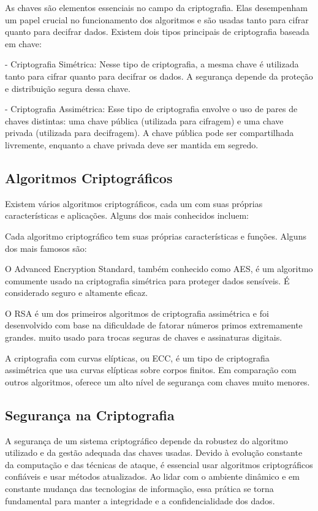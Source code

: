 As chaves são elementos essenciais no campo da criptografia. Elas desempenham um papel crucial no funcionamento dos algoritmos e são usadas tanto para cifrar quanto para decifrar dados. Existem dois tipos principais de criptografia baseada em chave:

- Criptografia Simétrica: Nesse tipo de criptografia, a mesma chave é utilizada tanto para cifrar quanto para decifrar os dados. A segurança depende da proteção e distribuição segura dessa chave.

- Criptografia Assimétrica: Esse tipo de criptografia envolve o uso de pares de chaves distintas: uma chave pública (utilizada para cifragem) e uma chave privada (utilizada para decifragem). A chave pública pode ser compartilhada livremente, enquanto a chave privada deve ser mantida em segredo.


\subsection{Algoritmos Criptográficos}

Existem vários algoritmos criptográficos, cada um com suas próprias características e aplicações. Alguns dos mais conhecidos incluem:

Cada algoritmo criptográfico tem suas próprias características e funções. Alguns dos mais famosos são:

O Advanced Encryption Standard, também conhecido como AES, é um algoritmo comumente usado na criptografia simétrica para proteger dados sensíveis. É considerado seguro e altamente eficaz.

O RSA é um dos primeiros algoritmos de criptografia assimétrica e foi desenvolvido com base na dificuldade de fatorar números primos extremamente grandes. muito usado para trocas seguras de chaves e assinaturas digitais.

A criptografia com curvas elípticas, ou ECC, é um tipo de criptografia assimétrica que usa curvas elípticas sobre corpos finitos. Em comparação com outros algoritmos, oferece um alto nível de segurança com chaves muito menores.


\subsection{Segurança na Criptografia}

A segurança de um sistema criptográfico depende da robustez do algoritmo utilizado e da gestão adequada das chaves usadas. Devido à evolução constante da computação e das técnicas de ataque, é essencial usar algoritmos criptográficos confiáveis e usar métodos atualizados. Ao lidar com o ambiente dinâmico e em constante mudança das tecnologias de informação, essa prática se torna fundamental para manter a integridade e a confidencialidade dos dados.

